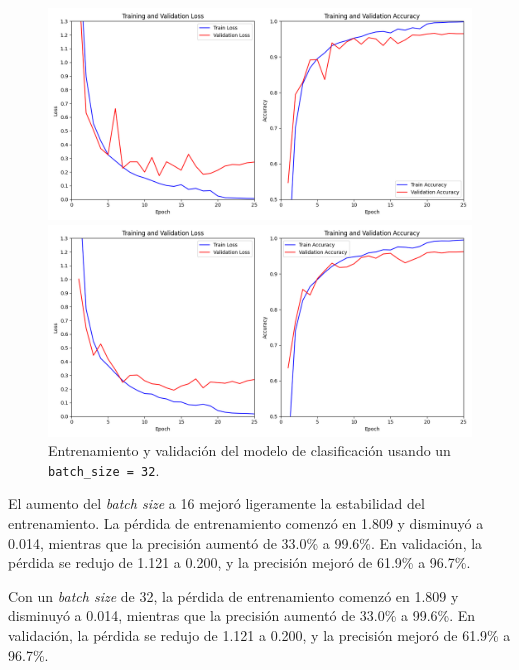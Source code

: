 \begin{figure}[h]  
    \centering
    \begin{minipage}{0.45\textwidth}
        \centering
        \includegraphics[width=1.1\textwidth]{img/malware_classifier_batch16.png}
        \caption{Entrenamiento y validación del modelo de clasificación usando un \lstinline|batch_size = 16|.}
        \label{fig:MMCbatch16}
    \end{minipage}\hfill
    \begin{minipage}{0.45\textwidth}
        \centering
        \includegraphics[width=1.1\textwidth]{img/malware_classifier_batch32.png}
        \caption{Entrenamiento y validación del modelo de clasificación usando un \lstinline|batch_size = 32|.}
        \label{fig:MMCbatch32}
    \end{minipage}
\end{figure}

El aumento del \textit{batch size} a 16 mejoró ligeramente la estabilidad del entrenamiento. La pérdida de entrenamiento comenzó en 1.809 y disminuyó a 0.014, mientras que la precisión aumentó de 33.0\% a 99.6\%. En validación, la pérdida se redujo de 1.121 a 0.200, y la precisión mejoró de 61.9\% a 96.7\%. 

Con un \textit{batch size} de 32, la pérdida de entrenamiento comenzó en 1.809 y disminuyó a 0.014, mientras que la precisión aumentó de 33.0\% a 99.6\%. En validación, la pérdida se redujo de 1.121 a 0.200, y la precisión mejoró de 61.9\% a 96.7\%.

